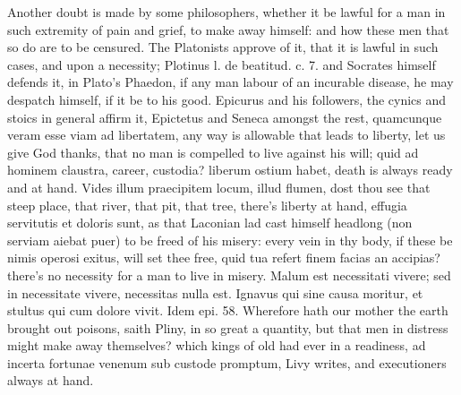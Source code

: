 Another doubt is made by some philosophers, whether it be lawful for a
man in such extremity of pain and grief, to make away himself: and how
these men that so do are to be censured. The Platonists approve of it,
that it is lawful in such cases, and upon a necessity; Plotinus l. de
beatitud. c. 7. and Socrates himself defends it, in Plato's Phaedon, if
any man labour of an incurable disease, he may despatch himself, if it
be to his good. Epicurus and his followers, the cynics and stoics in
general affirm it, Epictetus and Seneca amongst the rest,
quamcunque veram esse viam ad libertatem, any way is allowable that
leads to liberty, let us give God thanks, that no man is
compelled to live against his will;  quid ad hominem claustra,
career, custodia? liberum ostium habet, death is always ready and at
hand. Vides illum praecipitem locum, illud flumen, dost thou see that
steep place, that river, that pit, that tree, there's liberty at hand,
effugia servitutis et doloris sunt, as that Laconian lad cast himself
headlong (non serviam aiebat puer) to be freed of his misery: every
vein in thy body, if these be nimis operosi exitus, will set thee free,
quid tua refert finem facias an accipias? there's no necessity for a
man to live in misery. Malum est necessitati vivere; sed in necessitate
vivere, necessitas nulla est. Ignavus qui sine causa moritur, et
stultus qui cum dolore vivit. Idem epi. 58. Wherefore hath our mother
the earth brought out poisons, saith Pliny, in so great a
quantity, but that men in distress might make away themselves? which
kings of old had ever in a readiness, ad incerta fortunae venenum sub
custode promptum, Livy writes, and executioners always at hand.

